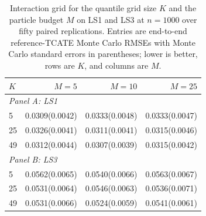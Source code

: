 \begin{table}[!ht]
\centering
\scriptsize
\setlength{\tabcolsep}{3pt}
\caption{Interaction grid for the quantile grid size $K$ and the particle budget $M$ on LS1 and LS3 at $n=1000$ over fifty paired replications. Entries are end-to-end reference-TCATE Monte Carlo RMSEs with Monte Carlo standard errors in parentheses; lower is better, rows are $K$, and columns are $M$.}
\label{tab:sensitivity-factorial}
\begin{tabular}{lrrr}
\toprule
$K$ & $M=5$ & $M=10$ & $M=25$ \\
\midrule
\multicolumn{4}{l}{\textit{Panel A: LS1}} \\
\midrule
5 & 0.0309(0.0042) & 0.0333(0.0048) & 0.0333(0.0047) \\
25 & 0.0326(0.0041) & 0.0311(0.0041) & 0.0315(0.0046) \\
49 & 0.0312(0.0044) & 0.0307(0.0039) & 0.0315(0.0042) \\
\multicolumn{4}{l}{\textit{Panel B: LS3}} \\
\midrule
5 & 0.0562(0.0065) & 0.0540(0.0066) & 0.0563(0.0067) \\
25 & 0.0531(0.0064) & 0.0546(0.0063) & 0.0536(0.0071) \\
49 & 0.0531(0.0066) & 0.0524(0.0059) & 0.0541(0.0061) \\
\bottomrule
\end{tabular}
\end{table}
